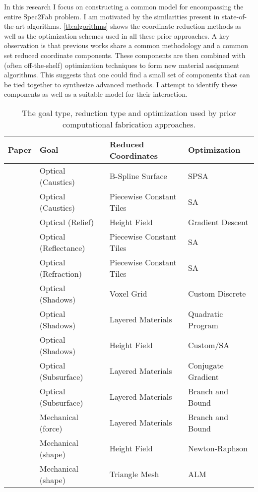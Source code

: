 In this research I focus on constructing a common model for encompassing the entire Spec2Fab problem.
I am motivated by the similarities present in state-of-the-art algorithms.
\autoref{tb:algorithms} shows the coordinate reduction methods as well as the optimization schemes
used in all these prior approaches.
A key observation is that previous works share a common methodology and  a common set reduced coordinate components. These components are then combined with (often off-the-shelf) optimization techniques
to form new material assignment algorithms.
This suggests that one could find a small set of components that can be tied together to synthesize  advanced methods.
I attempt to identify these components as well as a suitable model for their interaction.
\newpage
\begin{table*}
\centering
\begin{tabular}{clll}
\hline
\textbf{Paper} & \textbf{Goal} & \textbf{Reduced Coordinates}  & \textbf{Optimization} \\
\hline
~\cite{Finckh:2010} & Optical (Caustics) & B-Spline Surface & SPSA\footnotemark \\
~\cite{Marios:2011} & Optical (Caustics) & Piecewise Constant Tiles & SA\footnotemark \\
~\cite{Alexa:2010:RAI}& Optical (Relief) & Height Field & Gradient Descent\\
~\cite{Weyrich:2009:FMF} &Optical (Reflectance)&Piecewise Constant Tiles& SA\\
~\cite{Papas:2012} & Optical (Refraction) & Piecewise Constant Tiles & SA \\
~\cite{Mitra:2009:SA}&Optical (Shadows)&Voxel Grid&Custom Discrete\\
~\cite{Baran:2012:MLA}&Optical (Shadows)& Layered Materials & Quadratic Program \\
~\cite{Bermano:2012} & Optical (Shadows) & Height Field & Custom/SA \\
~\cite{Dong:2010:FSS}&Optical (Subsurface) &Layered Materials&Conjugate Gradient\\
~\cite{Hasan:2010:PRO}& Optical (Subsurface) & Layered Materials & Branch and Bound\\
~\cite{Bickel:2010:DAF}& Mechanical (force) & Layered Materials  & Branch and Bound \\
~\cite{Bickel:2012} & Mechanical (shape) &  Height Field &  Newton-Raphson \\
~\cite{sko:2012}& Mechanical (shape) & Triangle Mesh & ALM\footnotemark \\
\hline
\end{tabular}
\caption{The goal type, reduction type and optimization used by prior computational fabrication approaches.}
\label{tb:algorithms}
\end{table*}
\addtocounter{footnote}{-3}
